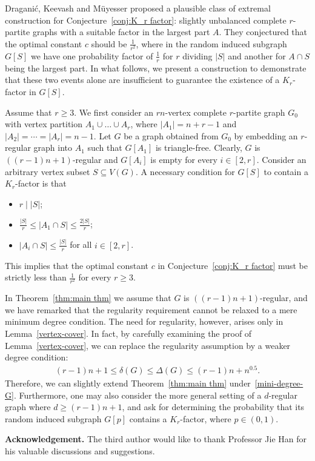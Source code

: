 \documentclass[11pt, a4paper]{article}
\theoremstyle{definition}
\newcommand{\<}{\subseteq}
\newcommand{\De}{\Delta}
\newcommand{\de}{\delta}
\begin{document}
{Dragani\'{c}, Keevash and M\"{u}yesser \cite{Keevash2025} proposed a plausible class of extremal construction for Conjecture~\ref{conj:K_r factor}: slightly unbalanced complete $r$-partite graphs with a suitable  factor in the largest part $A$.  They conjectured that the optimal constant $c$ should be  $\frac{1}{r^2}$, where in the random induced subgraph $G[S]$ we have one
probability factor of $\frac{1}{r}$ for $r$ dividing $|S|$ and another for $A\cap S$ being the largest part. In what follows, we present a construction to demonstrate that these two events alone are insufficient to guarantee the existence of a  $K_r$-factor in $G[S]$.}

{Assume that $r\geq 3$. We first consider an $rn$-vertex complete $r$-partite graph $G_0$ with vertex partition $A_1\cup \ldots \cup A_r$,  where $|A_1|=n+r-1$ and $|A_2|=\cdots=|A_r|=n-1$. Let $G$ be a graph obtained from $G_0$ by embedding an $r$-regular graph into  $A_1$ {such that $G[A_1]$ is triangle-free}. Clearly, $G$ is  $((r-1)n+1)$-regular and $G[A_i]$ is empty for every $i\in [2,r]$. Consider an arbitrary vertex subset $S\subseteq V(G)$. A necessary condition for $G[S]$ to contain a $K_r$-factor is that 
\begin{itemize}
    \item $r\mid |S|$;
    \item $\frac{|S|}{r}\le |A_1 \cap S|\le \frac{2|S|}{r}$;
   \item $|A_i \cap S|\le \frac{|S|}{r}$ for all $i \in [2,r]$. 
\end{itemize}
This implies that the optimal constant 
$c$ in Conjecture~\ref{conj:K_r factor} must be strictly less than $\frac{1}{r^2}$ {for every $r\ge 3$}. }

{In Theorem~\ref{thm:main thm} we assume that $G$ is $((r-1)n+1)$-regular, and we have remarked that the regularity requirement cannot be relaxed to a mere minimum degree condition. The need for regularity, however, arises only in Lemma~\ref{vertex-cover}. In fact, by carefully examining the proof of Lemma~\ref{vertex-cover}, we can replace the regularity assumption by a weaker degree condition: 
\begin{align}\label{mini-degree-G}
(r-1)n+1\leq \de(G)\leq \De(G)\leq (r-1)n+n^{0.5}.
\end{align}
Therefore, we can slightly extend Theorem~\ref{thm:main thm} under~\eqref{mini-degree-G}. Furthermore, one may also consider the more general setting of a $d$-regular graph where $d\ge(r-1)n+1$, and ask for determining the probability that its random induced subgraph $G[p]$ contains a $K_r$-factor, where $p\in(0,1)$.}

\vspace{0.5cm}
\textbf{Acknowledgement.}
The third author would like to thank Professor Jie Han for his valuable discussions and suggestions.



\end{document}
